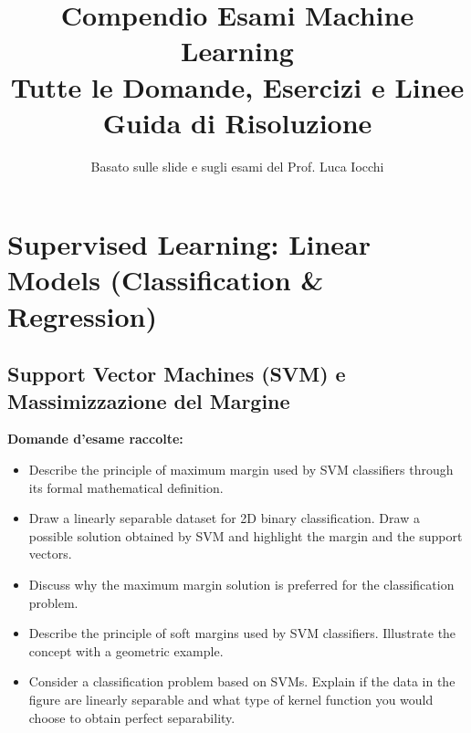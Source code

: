 \documentclass[11pt,a4paper]{article}
\title{\textbf{Compendio Esami Machine Learning}\\ \Large Tutte le Domande, Esercizi e Linee Guida di Risoluzione}
\author{Basato sulle slide e sugli esami del Prof. Luca Iocchi}
\date{}
\begin{document}
\maketitle
\tableofcontents
\newpage

\section{Supervised Learning: Linear Models (Classification \& Regression)}

\subsection{Support Vector Machines (SVM) e Massimizzazione del Margine}
\textbf{Domande d'esame raccolte:}
\begin{itemize}
    \item Describe the principle of maximum margin used by SVM classifiers through its formal mathematical definition.
    \item Draw a linearly separable dataset for 2D binary classification. Draw a possible solution obtained by SVM and highlight the margin and the support vectors.
    \item Discuss why the maximum margin solution is preferred for the classification problem.
    \item Describe the principle of soft margins used by SVM classifiers. Illustrate the concept with a geometric example.
    \item Consider a classification problem based on SVMs. Explain if the data in the figure are linearly separable and what type of kernel function you would choose to obtain perfect separability.
\end{itemize}
\end{document}
